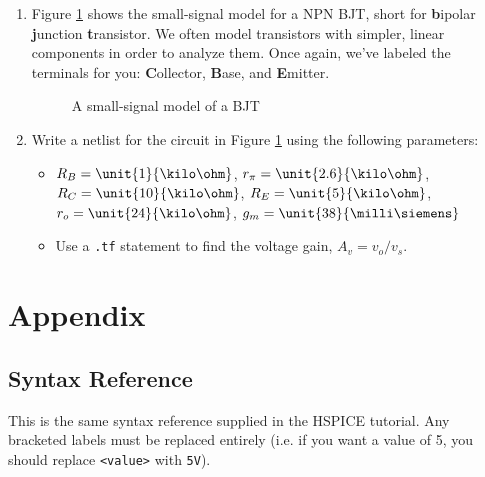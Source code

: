 \documentclass{article}
\begin{document}
\begin{enumerate}

\item Figure \ref{ss} shows the small-signal model for a NPN BJT, short for \textbf{b}ipolar \textbf{j}unction \textbf{t}ransistor. We often model transistors with simpler, linear components in order to analyze them. Once again, we've labeled the terminals for you: \textbf{C}ollector, \textbf{B}ase, and \textbf{E}mitter.

	\begin{figure}[!htb]
		
		\centerline{\box\graph}
		\caption{A small-signal model of a BJT}
		\label{ss}
	\end{figure}

\item Write a netlist for the circuit in Figure \ref{ss} using the following parameters:

	\begin{itemize}
	\item $R_B = \unit{1}{\kilo\ohm}$, $r_{\pi} = \unit{2.6}{\kilo\ohm}$, $R_C = \unit{10}{\kilo\ohm}$, $R_E = \unit{5}{\kilo\ohm}$, $r_o = \unit{24}{\kilo\ohm}$, $g_m = \unit{38}{\milli\siemens}$
	\item Use a \texttt{.tf} statement to find the voltage gain, $A_v = v_o/v_s$.
	\end{itemize}

\end{enumerate}

\section{Appendix}

\subsection{Syntax Reference}

This is the same syntax reference supplied in the HSPICE tutorial. Any bracketed labels must be replaced entirely (i.e. if you want a value of \unit{5}{\volt}, you should replace \verb|<value>| with \verb|5V|).
\end{document}
